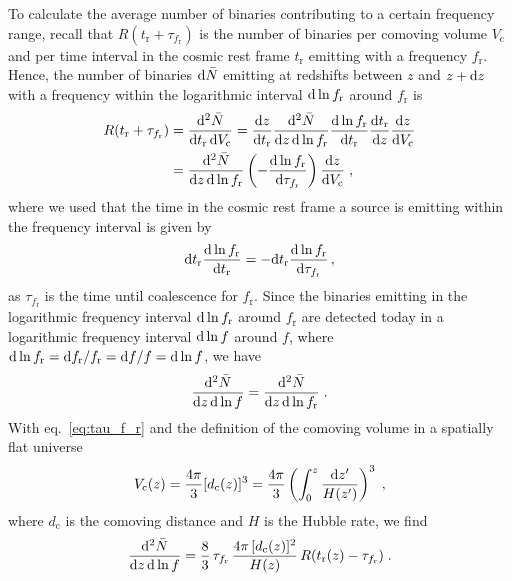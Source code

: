 To calculate the average number of binaries contributing to a certain frequency range, recall that $R(t_\text{r} + \tau_{f_\text{r}})$ is the number of binaries per comoving volume $V_\text{c}$ and per time  interval in the cosmic rest frame $t_\text{r}$ emitting with a frequency $f_\text{r}$. Hence, the number of binaries $\mathrm{d} \bar{N}$ emitting at redshifts between $z$ and $z + \mathrm{d} z$ with a frequency within the logarithmic interval $\mathrm{d} \ln f_\text{r}$ around $f_\text{r}$ is~\cite{Sesana:2008mz}
\begin{align}
	R (t_\text{r}+ \tau_{f_\text{r}}) &= \frac{\mathrm{d}^2 \bar{N}}{\mathrm{d} t_\text{r} \, \mathrm{d}  V_\text{c}}  = \frac{\mathrm{d} z}{\mathrm{d} t_\text{r}} \frac{\mathrm{d}^2 \bar{N}}{\mathrm{d} z \, \mathrm{d} \ln f_\text{r}} \frac{\mathrm{d} \ln f_\text{r}}{\mathrm{d} t_\text{r}} \frac{\mathrm{d} t_\text{r}}{\mathrm{d} z} \frac{\mathrm{d} z}{\mathrm{d} V_\text{c}} \nonumber \\
	&= \frac{\mathrm{d}^2 \bar{N}}{\mathrm{d} z \, \mathrm{d} \ln f_\text{r}} \left( - \frac{\mathrm{d} \ln f_\text{r}}{\mathrm{d} \tau_{f_\text{r}}} \right) \frac{\mathrm{d} z}{\mathrm{d} V_\text{c}}\;,
\end{align}
where we used that the time in the cosmic rest frame a source is emitting within the frequency interval is given by
\begin{align}
	\mathrm{d} t_\text{r} \frac{\mathrm{d} \ln f_\text{r}}{\mathrm{d} t_\text{r}} = - \mathrm{d} t_\text{r} \frac{\mathrm{d} \ln f_\text{r}}{\mathrm{d} \tau_{f_\text{r}}} \,,
\end{align}
as $\tau_{f_\text{r}}$ is the time until coalescence for $f_\text{r}$. Since the binaries emitting in the logarithmic frequency interval $\mathrm{d} \ln f_\text{r}$ around $f_\text{r}$ are detected today in a logarithmic frequency interval $\mathrm{d} \ln f$ around $f$, where $\mathrm{d} \ln f_\text{r} = \mathrm{d} f_\text{r} / f_\text{r} = \mathrm{d} f / f = \mathrm{d} \ln f$, we have
\begin{align}
	\frac{\mathrm{d}^2 \bar{N}}{\mathrm{d} z \, \mathrm{d} \ln f} = \frac{\mathrm{d}^2 \bar{N}}{\mathrm{d} z \, \mathrm{d} \ln f_\text{r}} \;.
\end{align}
With eq.~\eqref{eq:tau_f_r} and the definition of the comoving volume in a spatially flat universe
\begin{align}
	V_\text{c} (z) = \frac{4 \pi}{3} [d_\text{c}(z)]^3 = \frac{4 \pi}{3} \left( \int_0^z \frac{\mathrm{d} z'}{H(z')} \right)^3 \; ,
\end{align}
where $d_\text{c}$ is the comoving distance and $H$ is the Hubble rate, we find
\begin{align}
	\frac{\mathrm{d}^2 \bar{N}}{\mathrm{d} z \, \mathrm{d} \ln f} = \frac{8}{3} \, \tau_{f_\text{r}} \, \frac{4 \pi \, [d_\text{c}(z)]^2}{H(z)} \, R (t_\text{r}(z) - \tau_{f_\text{r}})\;.
\end{align}
